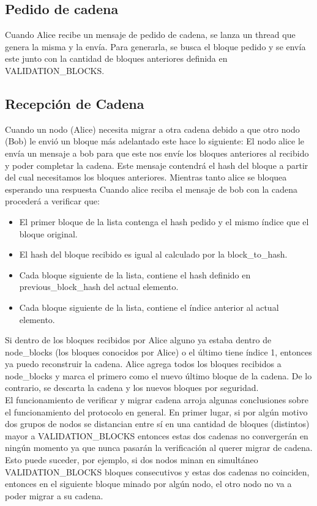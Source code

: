 \subsection{Pedido de cadena}
Cuando Alice recibe un mensaje de pedido de cadena, se lanza un thread que genera la misma y la envía. Para generarla, se busca el bloque pedido y se envía este junto con la cantidad de bloques anteriores definida en VALIDATION_BLOCKS.

\subsection{Recepción de Cadena}

Cuando un nodo (Alice) necesita migrar a otra cadena debido a que otro nodo (Bob) le envió un bloque más adelantado este hace lo siguiente:
El nodo alice le envía un mensaje a bob para que este nos envíe los
bloques anteriores al recibido y poder completar la cadena. Este mensaje contendrá el hash del bloque a partir del cual necesitamos los bloques anteriores. Mientras tanto alice se bloquea esperando una respuesta
Cuando alice reciba el mensaje de bob con la cadena procederá a verificar que:

\begin{itemize}
    \item El primer bloque de la lista contenga el hash pedido y el mismo índice que el bloque original.
    \item El hash del bloque recibido es igual al calculado por la block_to_hash.
    \item Cada bloque siguiente de la lista, contiene el hash definido en previous_block_hash del actual elemento.
    \item Cada bloque siguiente de la lista, contiene el índice anterior al actual elemento.
\end{itemize}

Si dentro de los bloques recibidos por Alice alguno ya estaba dentro de node_blocks (los bloques conocidos por Alice) o el último tiene índice 1, entonces ya puedo reconstruir la cadena. Alice agrega todos los bloques recibidos a node_blocks y marca el primero como el nuevo último bloque de la cadena. De lo contrario, se descarta la cadena y los nuevos bloques por seguridad.\\

El funcionamiento de verificar y migrar cadena arroja algunas conclusiones sobre el funcionamiento del protocolo en general. En primer lugar, si por algún motivo dos grupos de nodos se distancian entre sí en una cantidad de bloques (distintos) mayor a VALIDATION_BLOCKS entonces estas dos cadenas no convergerán en ningún momento ya que nunca pasarán la verificación al querer migrar de cadena. Esto puede suceder, por ejemplo, si dos nodos minan en simultáneo VALIDATION_BLOCKS bloques consecutivos y estas dos cadenas no coinciden, entonces en el siguiente bloque minado por algún nodo, el otro nodo no va a poder migrar a su cadena.\\

